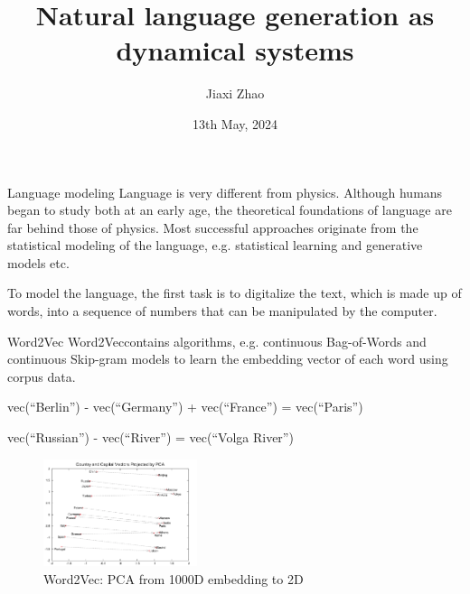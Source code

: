 \documentclass{beamer}
\title[NLG]{Natural language generation as dynamical systems}
\author[J. Zhao]{Jiaxi Zhao}
\date{13th May, 2024}
\begin{document}
\par \setlength{\parindent}{2em}
\newcommand{\JX}[1]{{\color{blue}{$^{\text{JX}}$[#1]}}}

\begin{frame}
\titlepage

\end{frame}

\begin{frame}{Language modeling}
	Language is very different from physics. Although humans began to study both at an early age, the theoretical foundations
	of language are far behind those of physics. Most successful approaches originate from the statistical modeling of the language, e.g.
	statistical learning and generative models etc.

	To model the language, the first task is to digitalize the text, which is made up of words, 
	into a sequence of numbers that can be manipulated by the computer.
\end{frame}

\begin{frame}{Word2Vec}
	Word2Vec\footnotemark[1] contains algorithms, e.g. continuous Bag-of-Words and continuous Skip-gram models 
	to learn the embedding vector of each word using corpus data. 

	vec(“Berlin”) - vec(“Germany”) + vec(“France”) = vec(“Paris”)

	vec(“Russian”) - vec(“River”) = vec(“Volga River”)
	\begin{figure}
		\centering
		\includegraphics[width=0.4\textwidth]{fig/Word2Vec.jpg}
		\caption{Word2Vec: PCA from 1000D embedding to 2D}
	\end{figure}
\end{frame}
\end{document}
